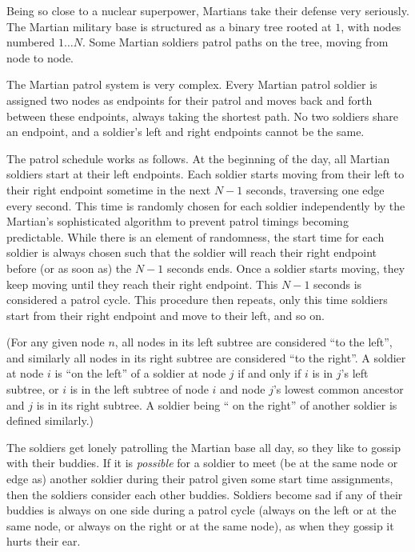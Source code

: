 
Being so close to a nuclear superpower, Martians take their defense very seriously.
The Martian military base is structured as a binary tree rooted at $1$, with nodes numbered $1 \dots N$.
Some Martian soldiers patrol paths on the tree, moving from node to node. 

The Martian patrol system is very complex. Every Martian patrol soldier is assigned two nodes as endpoints
for their patrol and moves back and forth between these endpoints, always taking the shortest path.
No two soldiers share an endpoint, and a soldier's left and right endpoints cannot be the same.

The patrol schedule works as follows. At the beginning of the day, all Martian soldiers start at their
left endpoints. Each soldier starts moving from their left to their right endpoint sometime in the
next $N - 1$ seconds, traversing one edge every second. This time is randomly chosen for each soldier
independently by the Martian's sophisticated algorithm to prevent patrol timings becoming predictable. While
there is an element of randomness, the start time for each soldier is always chosen such that the
soldier will reach their right endpoint before (or as soon as) the $N - 1$ seconds ends. Once a soldier
starts moving, they keep moving until they reach their right endpoint. This $N - 1$ seconds is considered a
patrol cycle. This procedure then repeats, only this time soldiers start from their right endpoint and
move to their left, and so on.

(For any given node $n$, all nodes in its left subtree are considered ``to the left'', and similarly all
nodes in its right subtree are considered ``to the right''. A soldier at node $i$ is ``on the left'' of a
soldier at node $j$ if and only if $i$ is in $j$'s left subtree, or $i$ is in the left subtree of node $i$
and node $j$'s lowest common ancestor and $j$ is in its right subtree. A soldier being `` on the right'' of
another soldier is defined similarly.)

The soldiers get lonely patrolling the Martian base all day, so they like to gossip with their buddies.
If it is \emph{possible} for a soldier to meet (be at the same node or edge as) another soldier during
their patrol given some start time assignments, then the soldiers consider each other buddies. Soldiers
become sad if any of their buddies is always on one side during a patrol cycle (always
on the left or at the same node, or always on the right or at the same node), as when they gossip it hurts
their ear.

